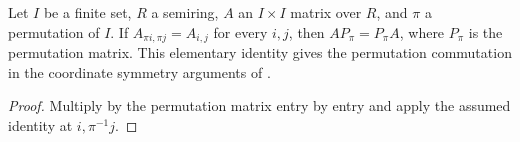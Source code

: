 \begin{lemma}
    \label{lem:peps_permutation_matrix_commutation}
    \leanok
    Let $I$ be a finite set, $R$ a semiring, $A$ an $I\times I$ matrix
    over $R$, and $\pi$ a permutation of $I$. If
    $A_{\pi i,\pi j}=A_{i,j}$ for every $i,j$, then
    $AP_\pi=P_\pi A$, where $P_\pi$ is the permutation matrix.
    This elementary identity gives the permutation commutation in the
    coordinate symmetry arguments of
    \cite[charge-pair creation, lines 2505--2558]{Schuch2010PEPS}.
\end{lemma}
\begin{proof}\leanok
    Multiply by the permutation matrix entry by entry and apply the
    assumed identity at $i,\pi^{-1}j$.
\end{proof}
